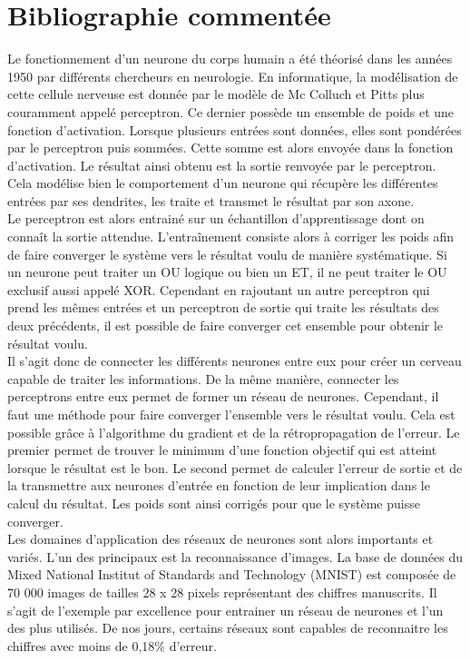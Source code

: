 \documentclass[french,12pt]{article}
\begin{document}
\section*{Bibliographie commentée}
Le fonctionnement d’un neurone du corps humain a été théorisé dans les années 1950 par différents chercheurs en neurologie. En informatique, la modélisation de cette cellule nerveuse est donnée par le modèle de Mc Colluch et Pitts plus couramment appelé perceptron. Ce dernier possède un ensemble de poids et une fonction d’activation. Lorsque plusieurs entrées sont données, elles sont pondérées par le perceptron puis sommées. Cette somme est alors envoyée dans la fonction d’activation. Le résultat ainsi obtenu est la sortie renvoyée par le perceptron. Cela modélise bien le comportement d’un neurone qui récupère les différentes entrées par ses dendrites, les traite et transmet le résultat par son axone.
\cite{perceptron} 
\\

Le perceptron est alors entrainé sur un échantillon d'apprentissage dont on connaît la sortie attendue. L'entraînement consiste alors à corriger les poids afin de faire converger le système vers le résultat voulu de manière systématique. Si un neurone peut traiter un OU logique ou bien un ET, il ne peut traiter le OU exclusif aussi appelé XOR. Cependant en rajoutant un autre perceptron qui prend les mêmes entrées et un perceptron de sortie qui traite les résultats des deux précédents, il est possible de faire converger cet ensemble pour obtenir le résultat voulu.
\cite{xor}
\\

Il s’agit donc de connecter les différents neurones entre eux pour créer un cerveau capable de traiter les informations. De la même manière, connecter les perceptrons entre eux permet de former un réseau de neurones. Cependant, il faut une méthode pour faire converger l’ensemble vers le résultat voulu. Cela est possible grâce à l’algorithme du gradient et de la rétropropagation de l’erreur. Le premier permet de trouver le minimum d’une fonction objectif qui est atteint lorsque le résultat est le bon. Le second permet de calculer l’erreur de sortie et de la transmettre aux neurones d’entrée en fonction de leur implication dans le calcul du résultat. Les poids sont ainsi corrigés pour que le système puisse converger.
\cite{livre1}
\cite{billet}
\\

Les domaines d’application des réseaux de neurones sont alors importants et variés. L’un des principaux est la reconnaissance d’images. La base de données du Mixed National Institut of Standards and Technology (MNIST) est composée de 70 000 images de tailles 28 x 28 pixels représentant des chiffres manuscrits. Il s’agit de l’exemple par excellence pour entrainer un réseau de neurones et l’un des plus utilisés. De nos jours, certains réseaux sont capables de reconnaitre les chiffres avec moins de 0,18\% d’erreur. 
\cite{mnist}
\\
\end{document}
